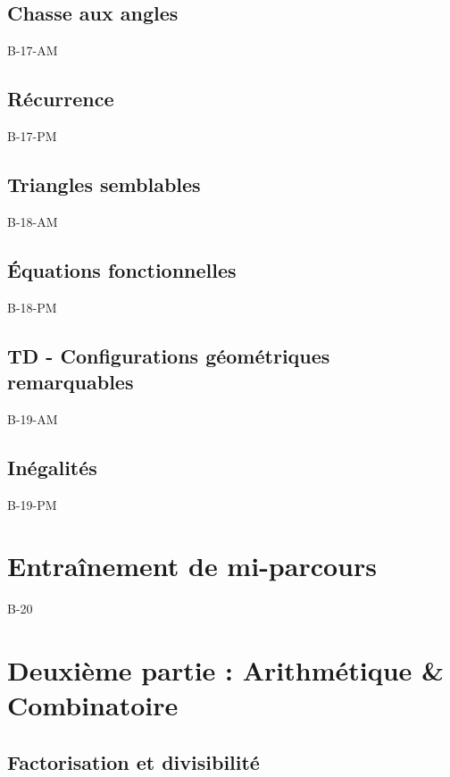 \documentclass[poly,trombi]{valbonne}
\begin{document}
\subsection{Chasse aux angles}

{B-17-AM}

\subsection{Récurrence}

{B-17-PM}

\subsection{Triangles semblables}

{B-18-AM}

\subsection{Équations fonctionnelles}

{B-18-PM}

\subsection{TD - Configurations géométriques remarquables}

{B-19-AM}

\subsection{Inégalités}

{B-19-PM}


\section{Entraînement de mi-parcours}

{B-20}


\section{Deuxième partie : Arithmétique \& Combinatoire}

\subsection{Factorisation et divisibilité}
\end{document}
